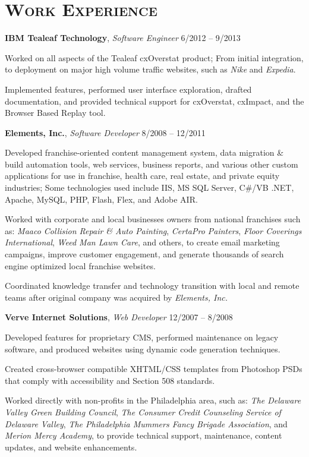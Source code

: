 \documentclass[12pt,a4paper]{article}
\newcommand{\sectionhead}{\normalfont\normalsize\scshape}
\newcommand{\workhead}[3]{\textbf{#1}, \emph{#2} \hfill #3}
\newcommand{\li}{\item[--]}
\begin{document}
\section*{\sectionhead Work Experience}
\begin{description}[leftmargin=0em] 
    \itemsep0pt
    \parskip3pt
    \item 
        \workhead{IBM Tealeaf Technology}{Software Engineer}{6/2012 -- 9/2013}
        \begin{itemize*}
            \li Worked on all aspects of the Tealeaf cxOverstat product; From initial integration, to deployment on major high volume traffic websites, such as \emph{Nike} and \emph{Expedia}.
            \li Implemented features, performed user interface exploration, drafted documentation, and provided technical support for cxOverstat, cxImpact, and the Browser Based Replay tool.
        \end{itemize*}

    \item 
        \workhead{Elements, Inc.}{Software Developer}{8/2008 -- 12/2011}
        \begin{itemize*}
            \li Developed franchise-oriented content management system, data migration \& build automation tools, web services, business reports, and various other custom applications for use in franchise, health care, real estate, and private equity industries; Some technologies used include IIS, MS SQL Server, C\#/VB .NET, Apache, MySQL, PHP, Flash, Flex, and Adobe AIR.
            \li Worked with corporate and local businesses owners from national franchises such as: \emph{Maaco Collision Repair \& Auto Painting}, \emph{CertaPro Painters}, \emph{Floor Coverings International}, \emph{Weed Man Lawn Care}, and others, to create email marketing campaigns, improve customer engagement, and generate thousands of search engine optimized local franchise websites.
            \li Coordinated knowledge transfer and technology transition with local and remote teams after original company was acquired by \emph{Elements, Inc.}
        \end{itemize*}

    \item 
        \workhead{Verve Internet Solutions}{Web Developer}{12/2007 -- 8/2008}
        \begin{itemize*}
            \li Developed features for proprietary CMS, performed maintenance on legacy software, and produced websites using dynamic code generation techniques.
            \li Created cross-browser compatible XHTML/CSS templates from Photoshop PSDs that comply with accessibility and Section 508 standards.
            \li Worked directly with non-profits in the Philadelphia area, such as: \emph{The Delaware Valley Green Building Council}, \emph{The Consumer Credit Counseling Service of Delaware Valley}, \emph{The Philadelphia Mummers Fancy Brigade Association}, and \emph{Merion Mercy Academy}, to provide technical support, maintenance, content updates, and website enhancements.
        \end{itemize*}


\end{description}
\end{document}
